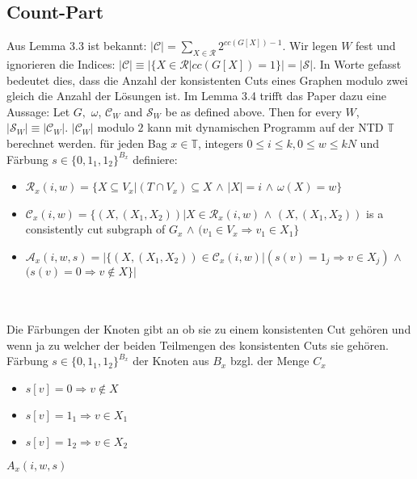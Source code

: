 \subsection{Count-Part}
Aus Lemma 3.3 ist bekannt: $|\mathcal{C}|=\sum_{X \in \mathcal{R}} 2^{cc(G[X])-1}$. Wir legen $W$ fest und ignorieren die Indices: $|\mathcal{C}| \equiv |\{X \in \mathcal{R} |cc(G[X]) = 1\}| = |\mathcal{S}|$. In Worte gefasst bedeutet dies, dass die Anzahl der konsistenten Cuts eines Graphen modulo zwei gleich die Anzahl der Lösungen ist. Im Lemma 3.4 trifft das Paper dazu eine Aussage: Let $G,$ $\omega$, $\mathcal{C}_W$ and $\mathcal{S}_W$ be as defined above. Then for every $W$, $|\mathcal{S}_W| \equiv |\mathcal{C}_W|$.
$|\mathcal{C}_W|$ modulo $2$ kann mit dynamischen Programm auf der NTD $\mathbb{T}$ berechnet werden.
für jeden Bag $x \in \mathbb{T}$, integers $0 \leq i \leq k,0 \leq w \leq kN$ und Färbung $s \in \{0,1_1,1_2 \}^{B_x}$ definiere:
\begin{itemize}
\item $\mathcal{R}_x(i,w)=\{X \subseteq V_x | (T \cap V_x) \subseteq X$ $\wedge$ $|X| = i$ $\wedge$ $\omega (X) = w \}$
\item $\mathcal{C}_x (i,w) =\{ (X,(X_1,X_2)) | X \in \mathcal{R}_x(i,w)$ $\wedge$ $(X,(X_1,X_2))$ is a consistently cut subgraph of $G_x$ $\wedge$ $(v_1 \in V_x \Rightarrow v_1 \in X_1 \} $
\item $\mathcal{A}_x(i,w,s)=| \{ (X,(X_1,X_2)) \in \mathcal{C}_x(i,w) | (s(v) = 1_j \Rightarrow v \in X_j)$ $\wedge$ $(s(v)=0 \Rightarrow v \notin X \} |$
\end{itemize}\\
\\Die Färbungen der Knoten gibt an ob sie zu einem konsistenten Cut gehören und wenn ja zu welcher der beiden Teilmengen des konsistenten Cuts sie gehören.
Färbung $s \in \{0,1_1,1_2 \}^{B_x}$  der Knoten aus $B_x$ bzgl. der Menge $C_x$
\begin{itemize}
\item $s[v] = 0 \Rightarrow v \notin X$
\item $s[v] = 1_1 \Rightarrow v \in X_1$ 
\item $s[v] = 1_2 \Rightarrow v \in X_2$ 
\end{itemize}

$A_x(i,w,s)$